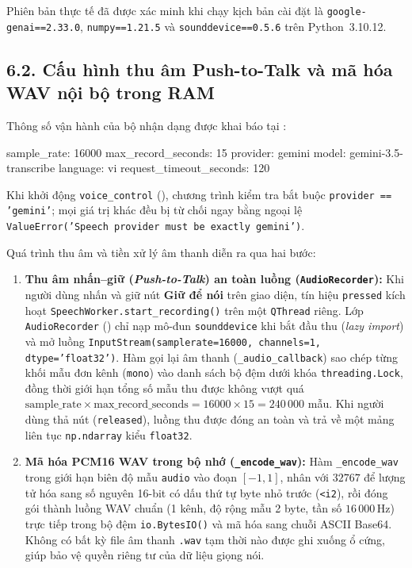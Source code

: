 Phiên bản thực tế đã được xác minh khi chạy kịch bản cài đặt là \texttt{google-genai==2.33.0}, \texttt{numpy==1.21.5} và \texttt{sounddevice==0.5.6} trên Python~3.10.12.

\subsection*{6.2. Cấu hình thu âm Push-to-Talk và mã hóa WAV nội bộ trong RAM}

Thông số vận hành của bộ nhận dạng được khai báo tại :

\begin{svcode}
sample_rate: 16000
max_record_seconds: 15
provider: gemini
model: gemini-3.5-transcribe
language: vi
request_timeout_seconds: 120
\end{svcode}

Khi khởi động \texttt{voice\_control} (), chương trình kiểm tra bắt buộc \texttt{provider == 'gemini'}; mọi giá trị khác đều bị từ chối ngay bằng ngoại lệ \texttt{ValueError('Speech provider must be exactly gemini')}.

Quá trình thu âm và tiền xử lý âm thanh diễn ra qua hai bước:
\begin{enumerate}[leftmargin=1.2cm]
  \item \textbf{Thu âm nhấn--giữ (\textit{Push-to-Talk}) an toàn luồng (\texttt{AudioRecorder}):}
  Khi người dùng nhấn và giữ nút \textbf{Giữ để nói} trên giao diện, tín hiệu \texttt{pressed} kích hoạt \texttt{SpeechWorker.start\_recording()} trên một \texttt{QThread} riêng. Lớp \texttt{AudioRecorder} () chỉ nạp mô-đun \texttt{sounddevice} khi bắt đầu thu (\textit{lazy import}) và mở luồng \texttt{InputStream(samplerate=16000, channels=1, dtype='float32')}. Hàm gọi lại âm thanh (\texttt{\_audio\_callback}) sao chép từng khối mẫu đơn kênh (\texttt{mono}) vào danh sách bộ đệm dưới khóa \texttt{threading.Lock}, đồng thời giới hạn tổng số mẫu thu được không vượt quá $\text{sample\_rate} \times \text{max\_record\_seconds} = 16000 \times 15 = 240\,000$ mẫu. Khi người dùng thả nút (\texttt{released}), luồng thu được đóng an toàn và trả về một mảng liên tục \texttt{np.ndarray} kiểu \texttt{float32}.

  \item \textbf{Mã hóa PCM16 WAV trong bộ nhớ (\texttt{\_encode\_wav}):}
  Hàm \texttt{\_encode\_wav} trong  giới hạn biên độ mẫu \texttt{audio} vào đoạn $[-1, 1]$, nhân với $32767$ để lượng tử hóa sang số nguyên 16-bit có dấu thứ tự byte nhỏ trước (\texttt{<i2}), rồi đóng gói thành luồng WAV chuẩn (1 kênh, độ rộng mẫu 2 byte, tần số $16\,000\,\text{Hz}$) trực tiếp trong bộ đệm \texttt{io.BytesIO()} và mã hóa sang chuỗi ASCII Base64. Không có bất kỳ file âm thanh \texttt{.wav} tạm thời nào được ghi xuống ổ cứng, giúp bảo vệ quyền riêng tư của dữ liệu giọng nói.
\end{enumerate}

